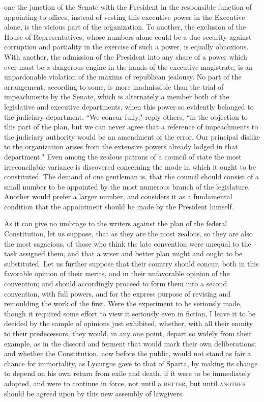 one the junction of the Senate with the President in the responsible function of appointing to offices, instead of vesting this executive power in the Executive alone, is the vicious part of the organization. To another, the exclusion of the House of Representatives, whose numbers alone could be a due security against corruption and partiality in the exercise of such a power, is equally obnoxious. With another, the admission of the President into any share of a power which ever must be a dangerous engine in the hands of the executive magistrate, is an unpardonable violation of the maxims of republican jealousy. No part of the arrangement, according to some, is more inadmissible than the trial of impeachments by the Senate, which is alternately a member both of the legislative and executive departments, when this power so evidently belonged to the judiciary department. ``We concur fully," reply others, ``in the objection to this part of the plan, but we can never agree that a reference of impeachments to the judiciary authority would be an amendment of the error. Our principal dislike to the organization arises from the extensive powers already lodged in that department." Even among the zealous patrons of a council of state the most irreconcilable variance is discovered concerning the mode in which it ought to be constituted. The demand of one gentleman is, that the council should consist of a small number to be appointed by the most numerous branch of the legislature. Another would prefer a larger number, and considers it as a fundamental condition that the appointment should be made by the President himself.

As it can give no umbrage to the writers against the plan of the federal Constitution, let us suppose, that as they are the most zealous, so they are also the most sagacious, of those who think the late convention were unequal to the task assigned them, and that a wiser and better plan might and ought to be substituted. Let us further suppose that their country should concur, both in this favorable opinion of their merits, and in their unfavorable opinion of the convention; and should accordingly proceed to form them into a second convention, with full powers, and for the express purpose of revising and remoulding the work of the first. Were the experiment to be seriously made, though it required some effort to view it seriously even in fiction, I leave it to be decided by the sample of opinions just exhibited, whether, with all their enmity to their predecessors, they would, in any one point, depart so widely from their example, as in the discord and ferment that would mark their own deliberations; and whether the Constitution, now before the public, would not stand as fair a chance for immortality, as Lycurgus gave to that of Sparta, by making its change to depend on his own return from exile and death, if it were to be immediately adopted, and were to continue in force, not until a \textsc{better}, but until \textsc{another} should be agreed upon by this new assembly of lawgivers.

